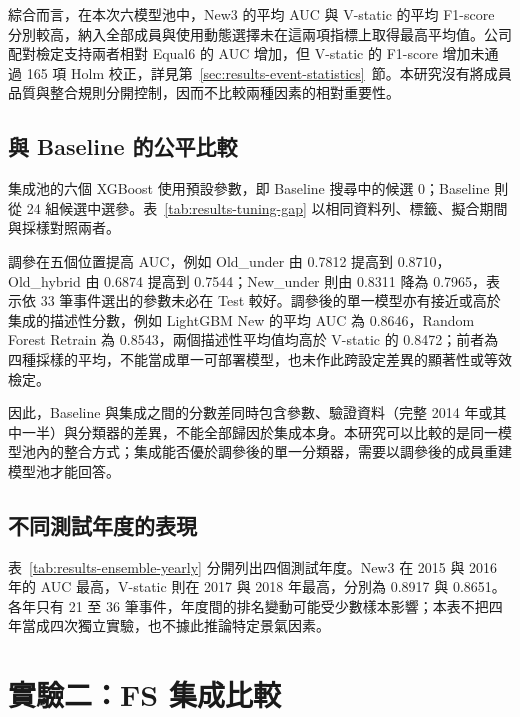 綜合而言，在本次六模型池中，New3 的平均 AUC 與 V-static 的平均 F1-score 分別較高，納入全部成員與使用動態選擇未在這兩項指標上取得最高平均值。公司配對檢定支持兩者相對 Equal6 的 AUC 增加，但 V-static 的 F1-score 增加未通過 165 項 Holm 校正，詳見第~\ref{sec:results-event-statistics}~節。本研究沒有將成員品質與整合規則分開控制，因而不比較兩種因素的相對重要性。

\subsection{與 Baseline 的公平比較}

集成池的六個 XGBoost 使用預設參數，即 Baseline 搜尋中的候選 0；Baseline 則從 24 組候選中選參。表~\ref{tab:results-tuning-gap} 以相同資料列、標籤、擬合期間與採樣對照兩者。



調參在五個位置提高 AUC，例如 Old\_under 由 0.7812 提高到 0.8710，Old\_hybrid 由 0.6874 提高到 0.7544；New\_under 則由 0.8311 降為 0.7965，表示依 33 筆事件選出的參數未必在 Test 較好。調參後的單一模型亦有接近或高於集成的描述性分數，例如 LightGBM New 的平均 AUC 為 0.8646，Random Forest Retrain 為 0.8543，兩個描述性平均值均高於 V-static 的 0.8472；前者為四種採樣的平均，不能當成單一可部署模型，也未作此跨設定差異的顯著性或等效檢定。

因此，Baseline 與集成之間的分數差同時包含參數、驗證資料（完整 2014 年或其中一半）與分類器的差異，不能全部歸因於集成本身。本研究可以比較的是同一模型池內的整合方式；集成能否優於調參後的單一分類器，需要以調參後的成員重建模型池才能回答。

\subsection{不同測試年度的表現}



表~\ref{tab:results-ensemble-yearly} 分開列出四個測試年度。New3 在 2015 與 2016 年的 AUC 最高，V-static 則在 2017 與 2018 年最高，分別為 0.8917 與 0.8651。各年只有 21 至 36 筆事件，年度間的排名變動可能受少數樣本影響；本表不把四年當成四次獨立實驗，也不據此推論特定景氣因素。

\section{實驗二：FS 集成比較}\label{sec:results-experiment2}

